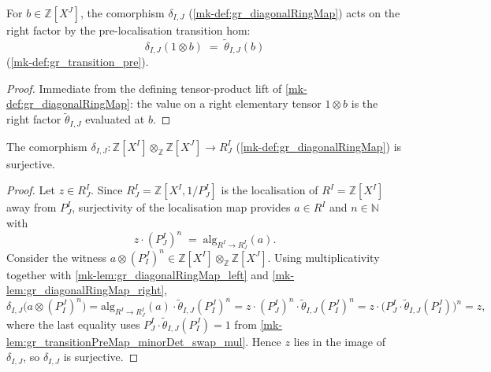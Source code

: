 \begin{lemma}\label{mk-lem:gr_diagonalRingMap_right}
  \leanok

  For \(b \in \mathbb{Z}[X^J]\), the comorphism \(\delta_{I,J}\)
  (\ref{mk-def:gr_diagonalRingMap}) acts on the right factor by the pre-localisation
  transition hom:
  \[
    \delta_{I,J}(1 \otimes b) \;=\; \tilde\theta_{I,J}(b)
  \]
  (\ref{mk-def:gr_transition_pre}).
\end{lemma}
\begin{proof}
  \leanok
  Immediate from the defining tensor-product lift of
  \ref{mk-def:gr_diagonalRingMap}: the value on a right elementary tensor \(1 \otimes
  b\) is the right factor \(\tilde\theta_{I,J}\) evaluated at \(b\).
\end{proof}

\begin{lemma}\label{mk-lem:gr_diagonalRingMap_surjective}
  \leanok

  The comorphism \(\delta_{I,J} : \mathbb{Z}[X^I] \otimes_{\mathbb{Z}}
  \mathbb{Z}[X^J] \to R^I_J\) (\ref{mk-def:gr_diagonalRingMap}) is surjective.
\end{lemma}
\begin{proof}
  \leanok
  Let \(z \in R^I_J\). Since \(R^I_J = \mathbb{Z}[X^I, 1/P^I_J]\) is the
  localisation of \(R^I = \mathbb{Z}[X^I]\) away from \(P^I_J\), surjectivity of
  the localisation map provides \(a \in R^I\) and \(n \in \mathbb{N}\) with
  \[
    z \cdot (P^I_J)^n \;=\; \mathrm{alg}_{R^I \to R^I_J}(a).
  \]
  Consider the witness \(a \otimes (P^J_I)^n \in \mathbb{Z}[X^I]
  \otimes_{\mathbb{Z}} \mathbb{Z}[X^J]\). Using multiplicativity together with
  \ref{mk-lem:gr_diagonalRingMap_left} and \ref{mk-lem:gr_diagonalRingMap_right},
  \[
    \delta_{I,J}\bigl(a \otimes (P^J_I)^n\bigr)
      = \mathrm{alg}_{R^I \to R^I_J}(a) \cdot \tilde\theta_{I,J}(P^J_I)^n
      = z \cdot (P^I_J)^n \cdot \tilde\theta_{I,J}(P^J_I)^n
      = z \cdot \bigl(P^I_J \cdot \tilde\theta_{I,J}(P^J_I)\bigr)^n
      = z,
  \]
  where the last equality uses \(P^I_J \cdot \tilde\theta_{I,J}(P^J_I) = 1\) from
  \ref{mk-lem:gr_transitionPreMap_minorDet_swap_mul}. Hence \(z\) lies in the image
  of \(\delta_{I,J}\), so \(\delta_{I,J}\) is surjective.
\end{proof}

